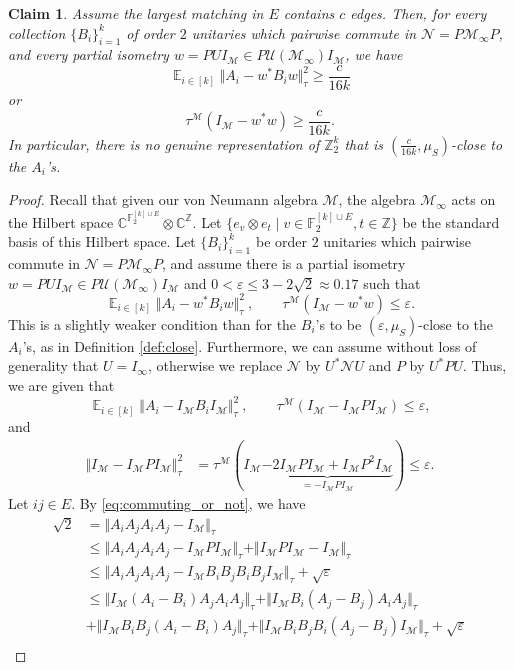 \documentclass[11pt]{article}
\newtheorem{claim}[theorem]{Claim}
\theoremstyle{definition}
\newcommand{\Id}{\ensuremath{I}}
\DeclareMathOperator*{\Expectation}{\mathbb{E}}
\newcommand{\field}{\mathbb{F}_2}
\newcommand{\complex}{\ensuremath{\mathbb{C}}}
\newcommand{\Z}{\ensuremath{\mathbb{Z}}}
\newcommand{\mM}{\ensuremath{\mathcal{M}}}
\newcommand{\mU}{\ensuremath{\mathcal{U}}}
\newcommand{\eps}{\varepsilon}
\newcommand{\mN}{\mathcal{N}}
\begin{document}
\begin{claim}\label{claim:appendix2}
Assume the largest matching in $E$ contains $c$ edges. Then, for every collection $\{B_i\}_{i=1}^k$ of order $2$ unitaries which pairwise commute in $\mN=P\mM_\infty P$, and  every partial isometry $w=PU\Id_\mM\in P\mU(\mM_\infty)\Id_\mM$, we have
\[
\Expectation_{i\in [k]} \Vert A_i-w^* B_iw\Vert_\tau^2 \geq  \frac{c}{16k} 
\]
or 
\[
\tau^\mM(\Id_\mM-w^*w)\geq  \frac{c}{16k}.
\]
In particular, there is no genuine representation of $\Z_2^k$ that is $(\frac{c}{16k},\mu_S)$-close to the $A_i$'s.
\end{claim}
\begin{proof}
Recall that given our von Neumann algebra $\mM$, the algebra $\mM_\infty$ acts on the Hilbert space $\complex^{\field^{[k]\cup E}}\otimes \complex^\Z$. Let $\{e_v\otimes e_t\mid v\in \field^{[k]\cup E},t\in \Z\}$ be the standard basis of this Hilbert space.
Let $\{B_i\}_{i=1}^k$ be order $2$ unitaries which pairwise commute in $\mN=P\mM_\infty P $, and assume  there is a partial isometry $w=PU\Id_\mM\in P\mU(\mM_\infty)\Id_\mM$ and  $0<\eps\leq 3-2\sqrt{2}\approx 0.17$ such that 
\[
\Expectation_{i\in [k]} \Vert A_i-w^* B_iw\Vert_\tau^2\ ,\qquad  \tau^\mM(\Id_\mM-w^*w)\leq  \eps.
\]
This is a slightly weaker condition than for the $B_i$'s to be $(\eps,\mu_S)$-close to the $A_i$'s, as in Definition \ref{def:close}. Furthermore, we can assume without loss of generality that $U=\Id_\infty$, otherwise we replace $\mN$ by $U^*\mN U$ and $P$ by $U^* PU$. Thus, we are given that 
\[
\Expectation_{i\in [k]} \Vert A_i-\Id_\mM  B_i\Id_\mM\Vert_\tau^2\ ,\qquad  \tau^\mM(\Id_\mM-\Id_\mM P\Id_\mM)\leq  \eps,
\]
and
\[
\begin{split}
    \Vert \Id_\mM-\Id_\mM P\Id_\mM\Vert_\tau^2 &=\tau^{\mM}(\Id_\mM\underbrace{-2\Id_\mM P\Id_\mM+\Id_\mM P^2\Id_\mM}_{=-\Id_\mM P\Id_\mM})\leq \eps.
\end{split}
\]
Let $ij\in E$. By \eqref{eq:commuting_or_not}, we have
\begin{align*}
    \sqrt{2}&=\Vert A_iA_jA_iA_j-\Id_\mM\Vert_\tau\\
    &\leq \Vert A_iA_jA_iA_j-\Id_\mM P\Id_\mM\Vert_\tau+\Vert \Id_\mM P\Id_\mM-\Id_\mM\Vert_\tau\\
    &\leq \Vert A_iA_jA_iA_j-\Id_\mM B_iB_jB_iB_j\Id_\mM\Vert_\tau+\sqrt\eps\\
    &\leq \Vert \Id_\mM(A_i-B_i)A_jA_iA_j\Vert_\tau+\Vert \Id_\mM B_i(A_j-B_j)A_iA_j\Vert_\tau\\
    &+\Vert \Id_\mM B_iB_j(A_i-B_i)A_j\Vert_\tau+\Vert \Id_\mM B_iB_jB_i(A_j-B_j)\Id_\mM\Vert_\tau+\sqrt\eps\\

\end{align*}
\end{proof}
\end{document}
